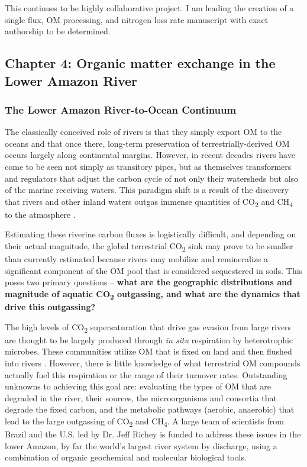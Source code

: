\documentclass[12pt, letterpaper, twoside]{article}
\begin{document}
This continues to be highly collaborative project. I am leading the creation of a single flux, OM processing, and nitrogen loss rate manuscript with exact authorship to be determined. 

\subsection{Chapter 4: Organic matter exchange in the Lower Amazon River}

\subsubsection{The Lower Amazon River-to-Ocean Continuum}

The classically conceived role of rivers is that they simply export OM to the oceans and that once there, long-term preservation of terrestrially-derived OM occurs largely along continental margins. However, in recent decades rivers have come to be seen not simply as transitory pipes, but as themselves transformers and regulators that adjust the carbon cycle of not only their watersheds but also of the marine receiving waters. This paradigm shift is a result of the discovery that rivers and other inland waters outgas immense quantities of CO\textsubscript{2} and CH\textsubscript{4} to the atmosphere \cite{butman_significant_2011, richey_outgassing_2002}. 

Estimating these riverine carbon fluxes is logistically difficult, and depending on their actual magnitude, the global terrestrial CO\textsubscript{2} sink may prove to be smaller than currently estimated because rivers may mobilize and remineralize a significant component of the OM pool that is considered sequestered in soils. This poses two primary questions – \textbf{what are the geographic distributions and magnitude of aquatic CO\textsubscript{2} outgassing, and what are the dynamics that drive this outgassing?} 

The high levels of CO\textsubscript{2} supersaturation that drive gas evasion from large rivers are thought to be largely produced through \textit{in situ} respiration by heterotrophic microbes. These communities utilize OM that is fixed on land and then flushed into rivers \cite{mayorga_young_2005, ward_degradation_2013, ward_reactivity_2016}. However, there is little knowledge of what terrestrial OM compounds actually fuel this respiration or the range of their turnover rates.  Outstanding unknowns to achieving this goal are: evaluating the types of OM that are degraded in the river, their sources, the microorganisms and consortia that degrade the fixed carbon, and the metabolic pathways (aerobic, anaerobic) that lead to the large outgassing of CO\textsubscript{2} and CH\textsubscript{4}. A large team of scientists from Brazil and the U.S. led by Dr. Jeff Richey is funded to address these issues in the lower Amazon, by far the world's largest river system by discharge, using a combination of organic geochemical and molecular biological tools.
\end{document}
